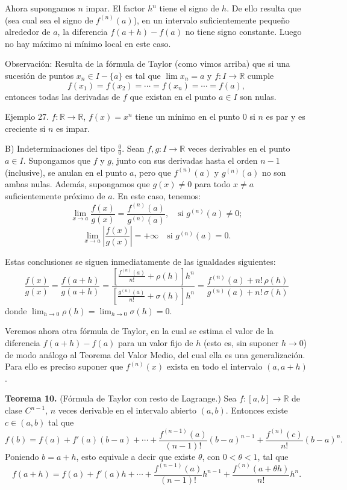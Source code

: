 \documentclass[12pt,oneside]{book}
\begin{document}
Ahora supongamos \( n \) impar. El factor \( h^n \) tiene el signo de \( h \). De ello resulta que (sea cual sea el signo de \( f^{(n)}(a) \)), en un intervalo suficientemente pequeño alrededor de \( a \), la diferencia \( f(a+h) - f(a) \) no tiene signo constante. Luego no hay máximo ni mínimo local en este caso.

Observación: Resulta de la fórmula de Taylor (como vimos arriba) que si una sucesión de puntos \( x_n \in I - \{a\} \) es tal que \( \lim x_n = a \) y \( f: I \to \mathbb{R} \) cumple
\[
f(x_1) = f(x_2) = \cdots = f(x_n) = \cdots = f(a),
\]
entonces todas las derivadas de \( f \) que existan en el punto \( a \in I \) son nulas.

Ejemplo 27. \( f: \mathbb{R} \to \mathbb{R} \), \( f(x) = x^n \) tiene un mínimo en el punto \( 0 \) si \( n \) es par y es creciente si \( n \) es impar.

B) Indeterminaciones del tipo \( \frac{0}{0} \). Sean \( f, g: I \to \mathbb{R} \) veces derivables en el punto \( a \in I \). Supongamos que \( f \) y \( g \), junto con sus derivadas hasta el orden \( n-1 \) (inclusive), se anulan en el punto \( a \), pero que \( f^{(n)}(a) \) y \( g^{(n)}(a) \) no son ambas nulas. Además, supongamos que \( g(x) \neq 0 \) para todo \( x \neq a \) suficientemente próximo de \( a \). En este caso, tenemos:
\[
\lim_{x \to a} \frac{f(x)}{g(x)} = \frac{f^{(n)}(a)}{g^{(n)}(a)}, \quad \text{si } g^{(n)}(a) \neq 0;
\]
\[
\lim_{x \to a} \left| \frac{f(x)}{g(x)} \right| = +\infty \quad \text{si } g^{(n)}(a) = 0.
\]

Estas conclusiones se siguen inmediatamente de las igualdades siguientes:
\[
\frac{f(x)}{g(x)} = \frac{f(a+h)}{g(a+h)} = \frac{\left[ \frac{f^{(n)}(a)}{n!} + \rho(h) \right] h^n}{\left[ \frac{g^{(n)}(a)}{n!} + \sigma(h) \right] h^n} = \frac{f^{(n)}(a) + n!\,\rho(h)}{g^{(n)}(a) + n!\,\sigma(h)}
\]
donde \( \lim_{h \to 0} \rho(h) = \lim_{h \to 0} \sigma(h) = 0 \).

Veremos ahora otra fórmula de Taylor, en la cual se estima el valor de la diferencia \( f(a+h) - f(a) \) para un valor fijo de \( h \) (esto es, sin suponer \( h \to 0 \)) de modo análogo al Teorema del Valor Medio, del cual ella es una generalización. Para ello es preciso suponer que \( f^{(n)}(x) \) exista en todo el intervalo \( (a, a+h) \).

\textbf{Teorema 10.} (Fórmula de Taylor con resto de Lagrange.) Sea \( f: [a, b] \to \mathbb{R} \) de clase \( C^{n-1} \), \( n \) veces derivable en el intervalo abierto \( (a, b) \). Entonces existe \( c \in (a, b) \) tal que
\[
f(b) = f(a) + f'(a)(b-a) + \cdots + \frac{f^{(n-1)}(a)}{(n-1)!}(b-a)^{n-1} + \frac{f^{(n)}(c)}{n!}(b-a)^n.
\]
Poniendo \( b = a + h \), esto equivale a decir que existe \( \theta \), con \( 0 < \theta < 1 \), tal que
\[
f(a+h) = f(a) + f'(a)h + \cdots + \frac{f^{(n-1)}(a)}{(n-1)!}h^{n-1} + \frac{f^{(n)}(a+\theta h)}{n!}h^n.
\]
\end{document}
